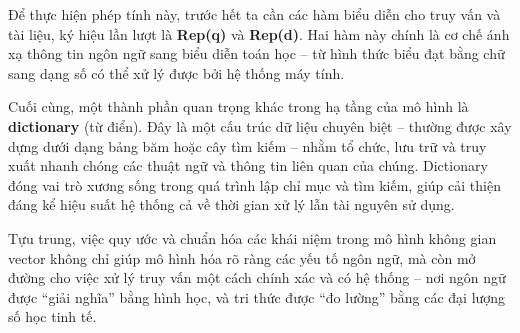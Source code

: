 Để thực hiện phép tính này, trước hết ta cần các hàm biểu diễn cho truy vấn và tài liệu, ký hiệu lần lượt là \textbf{Rep(q)} và \textbf{Rep(d)}. Hai hàm này chính là cơ chế ánh xạ thông tin ngôn ngữ sang biểu diễn toán học -- từ hình thức biểu đạt bằng chữ sang dạng số có thể xử lý được bởi hệ thống máy tính.

Cuối cùng, một thành phần quan trọng khác trong hạ tầng của mô hình là \textbf{dictionary} (từ điển). Đây là một cấu trúc dữ liệu chuyên biệt -- thường được xây dựng dưới dạng bảng băm hoặc cây tìm kiếm -- nhằm tổ chức, lưu trữ và truy xuất nhanh chóng các thuật ngữ và thông tin liên quan của chúng. Dictionary đóng vai trò xương sống trong quá trình lập chỉ mục và tìm kiếm, giúp cải thiện đáng kể hiệu suất hệ thống cả về thời gian xử lý lẫn tài nguyên sử dụng.

Tựu trung, việc quy ước và chuẩn hóa các khái niệm trong mô hình không gian vector không chỉ giúp mô hình hóa rõ ràng các yếu tố ngôn ngữ, mà còn mở đường cho việc xử lý truy vấn một cách chính xác và có hệ thống -- nơi ngôn ngữ được ``giải nghĩa'' bằng hình học, và tri thức được ``đo lường'' bằng các đại lượng số học tinh tế.
